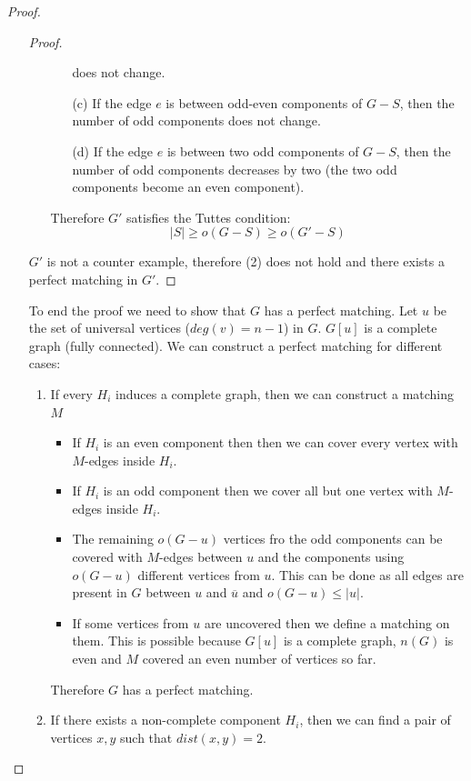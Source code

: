 \documentclass[notitlepage, 12pt]{article}
\begin{document}
\begin{proof}
\begin{itemize}
\begin{proof}
\begin{itemize}
\begin{itemize}
          does not change.
          \item[(c)] If the edge $e$ is between odd-even components of $G-S$, then the number of odd components
          does not change.
          \item[(d)] If the edge $e$ is between two odd components of $G-S$, then the number of odd components
          decreases by two (the two odd components become an even component).
        \end{itemize}
        Therefore $G'$ satisfies the Tuttes condition:
        \[|S| \geq o(G-S) \geq o(G'- S)\]
      \end{itemize}
      $G'$ is not a counter example, therefore (2) does not hold and there exists a perfect matching in $G'$.
    \end{proof}
    To end the proof we need to show that $G$ has a perfect matching. Let $u$ be the set of
    universal vertices ($deg(v) = n-1$) in $G$. $G[u]$ is a complete graph (fully connected).
    We can construct a perfect matching for different cases:
    \begin{enumerate}
      \item If every $H_i$ induces a complete graph, then we can construct a matching $M$
      \begin{itemize}
        \item If $H_i$ is an even component then then we can cover every vertex with $M$-edges inside $H_i$.
        \item If $H_i$ is an odd component then we cover all but one vertex with $M$-edges inside $H_i$.
        \item The remaining $o(G-u)$ vertices fro the odd components can be covered with $M$-edges between $u$
        and the components using $o(G-u)$ different vertices from $u$. This can be done as all edges are present
        in $G$ between $u$ and $\overline{u}$ and $o(G-u) \leq |u|$.
        \item If some vertices from $u$ are uncovered then we define a matching on them. This is possible
        because $G[u]$ is a complete graph, $n(G)$ is even and $M$ covered an even number of vertices so far.
      \end{itemize}
      Therefore $G$ has a perfect matching.

      \item If there exists a non-complete component $H_i$, then we can find a pair of vertices $x,y$ such that
      $dist(x,y) = 2$.

      \begin{center}
        \begin{tikzpicture}


\end{tikzpicture}
\end{center}
\end{enumerate}
\end{itemize}
\end{proof}
\end{document}
